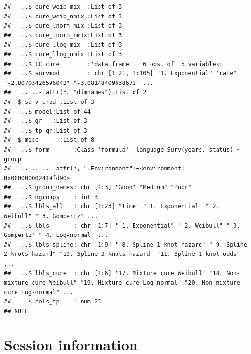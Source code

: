 \documentclass[]{article}
\begin{document}
\begin{verbatim}
##   ..$ cure_weib_mix  :List of 3
##   ..$ cure_weib_nmix :List of 3
##   ..$ cure_lnorm_mix :List of 3
##   ..$ cure_lnorm_nmix:List of 3
##   ..$ cure_llog_mix  :List of 3
##   ..$ cure_llog_nmix :List of 3
##   ..$ IC_cure        :'data.frame':  6 obs. of  5 variables:
##   ..$ survmod        : chr [1:21, 1:105] "1. Exponential" "rate" "-2.80703426596042" "-3.08148409638671" ...
##   .. ..- attr(*, "dimnames")=List of 2
##  $ surv_pred :List of 3
##   ..$ model:List of 44
##   ..$ gr   :List of 3
##   ..$ tp_gr:List of 3
##  $ misc      :List of 8
##   ..$ form       :Class 'formula'  language Surv(years, status) ~ group
##   .. .. ..- attr(*, ".Environment")=<environment: 0x000000002419fd90> 
##   ..$ group_names: chr [1:3] "Good" "Medium" "Poor"
##   ..$ ngroups    : int 3
##   ..$ lbls_all   : chr [1:23] "time" " 1. Exponential" " 2. Weibull" " 3. Gompertz" ...
##   ..$ lbls       : chr [1:7] " 1. Exponential" " 2. Weibull" " 3. Gompertz" " 4. Log-normal" ...
##   ..$ lbls_spline: chr [1:9] " 8. Spline 1 knot hazard" " 9. Spline 2 knots hazard" "10. Spline 3 knots hazard" "11. Spline 1 knot odds" ...
##   ..$ lbls_cure  : chr [1:6] "17. Mixture cure Weibull" "18. Non-mixture cure Weibull" "19. Mixture cure Log-normal" "20. Non-mixture cure Log-normal" ...
##   ..$ cols_tp    : num 23
## NULL
\end{verbatim}

\newpage

\section{Session information}\label{session-information}
\end{document}
